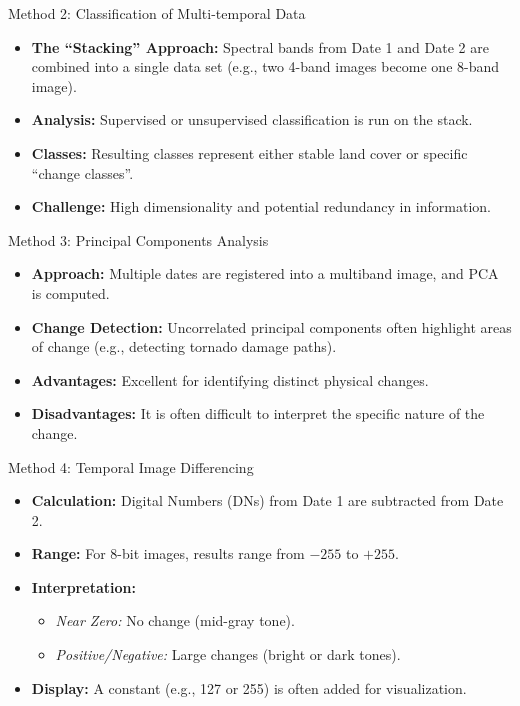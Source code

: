 \documentclass[aspectratio=169]{beamer}
\begin{document}
\begin{frame}{Method 2: Classification of Multi-temporal Data}
    \begin{itemize}
        \item \textbf{The ``Stacking'' Approach:} Spectral bands from Date 1 and Date 2 are combined into a single data set (e.g., two 4-band images become one 8-band image).
        \item \textbf{Analysis:} Supervised or unsupervised classification is run on the stack.
        \item \textbf{Classes:} Resulting classes represent either stable land cover or specific ``change classes''.
        \item \textbf{Challenge:} High dimensionality and potential redundancy in information.
    \end{itemize}
\end{frame}

\begin{frame}{Method 3: Principal Components Analysis}
    \begin{itemize}
        \item \textbf{Approach:} Multiple dates are registered into a multiband image, and PCA is computed.
        \item \textbf{Change Detection:} Uncorrelated principal components often highlight areas of change (e.g., detecting tornado damage paths).
        \item \textbf{Advantages:} Excellent for identifying distinct physical changes.
        \item \textbf{Disadvantages:} It is often difficult to interpret the specific nature of the change.
    \end{itemize}
\end{frame}

\begin{frame}{Method 4: Temporal Image Differencing}
    \begin{itemize}
        \item \textbf{Calculation:} Digital Numbers (DNs) from Date 1 are subtracted from Date 2.
        \item \textbf{Range:} For 8-bit images, results range from $-255$ to $+255$.
        \item \textbf{Interpretation:}
        \begin{itemize}
            \item \textit{Near Zero:} No change (mid-gray tone).
            \item \textit{Positive/Negative:} Large changes (bright or dark tones).
        \end{itemize}
        \item \textbf{Display:} A constant (e.g., 127 or 255) is often added for visualization.
    \end{itemize}
\end{frame}
\end{document}

